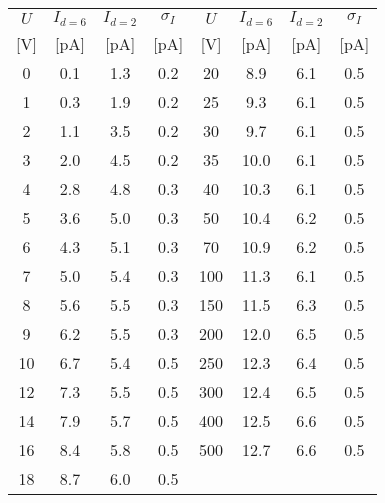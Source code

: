 \begin{tabular}[t]{
S[table-format=2.0]
S[table-format=1.1]
S[table-format=1.1]
S[table-format=1.1]
|
S[table-format=3.0]
S[table-format=2.1]
S[table-format=1.1]
S[table-format=1.1]
}
    \toprule
    {$U$} & {$I_{d=6}$} & {$I_{d=2}$} & {$\sigma_I$} & {$U$} & {$I_{d=6}$} & {$I_{d=2}$} & {$\sigma_I$}\\
    {[V]} & {[pA]}      & {[pA]}      & {[pA]}       & {[V]} & {[pA]}      & {[pA]}      & {[pA]}      \\ 	&	0.1	&	1.3	&	0.2	&	20	&	8.9 	&	6.1	&	0.5 \\
    1	&	0.3	&	1.9	&	0.2	&	25	&	9.3 	&	6.1	&	0.5 \\
    2	&	1.1	&	3.5	&	0.2	&	30	&	9.7	    &	6.1	&	0.5 \\
    3	&	2.0	&	4.5	&	0.2	&	35	&	10.0    &	6.1	&	0.5 \\
    4	&	2.8	&	4.8	&	0.3	&	40	&	10.3	&	6.1	&	0.5 \\
    5	&	3.6	&	5.0	&	0.3	&	50	&	10.4	&	6.2	&	0.5 \\
    6	&	4.3	&	5.1	&	0.3	&	70	&	10.9	&	6.2	&	0.5 \\
    7	&	5.0	&	5.4	&	0.3	&	100	&	11.3	&	6.1	&	0.5 \\
    8	&	5.6	&	5.5	&	0.3	&	150	&	11.5	&	6.3	&	0.5 \\
    9	&	6.2	&	5.5	&	0.3	&	200	&	12.0    &	6.5	&	0.5 \\
    10	&	6.7	&	5.4	&	0.5	&	250	&	12.3	&	6.4	&	0.5 \\
    12	&	7.3	&	5.5	&	0.5	&	300	&	12.4	&	6.5	&	0.5 \\
    14	&	7.9	&	5.7	&	0.5	&	400	&	12.5	&	6.6	&	0.5 \\
    16	&	8.4	&	5.8	&	0.5	&	500	&	12.7	&	6.6	&	0.5 \\
    18	&	8.7	&	6.0	&	0.5	&		&	    	&		&       \\
 \bottomrule
\end{tabular}